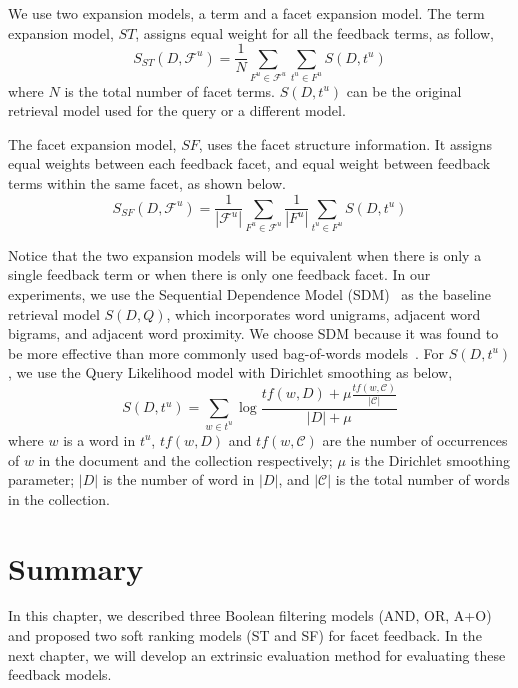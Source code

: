 We use two expansion models, a term and a facet expansion model. The term expansion model, $ST$, assigns equal weight for all the feedback terms, as follow,
\begin{equation}
S_{ST}(D,\mathcal{F}^u) = \frac{1}{N}\sum_{F^u\in\mathcal{F}^u}{\sum_{t^u\in F^u}{S(D,t^u)}}
\end{equation}
where $N$ is the total number of facet terms. $S(D,t^u)$ can be the original retrieval model used for the query or a different model.

The facet expansion model, $SF$, uses the facet structure information. It assigns equal weights between each feedback facet, and equal weight between feedback terms within the same facet, as shown below.
\begin{equation}
S_{SF}(D,\mathcal{F}^u) = \frac{1}{|\mathcal{F}^u|} \sum_{F^u \in \mathcal{F}^u}{ \frac{1}{|F^u|} \sum_{t^u \in F^u}{S(D, t^u)}}
\end{equation}

Notice that the two expansion models will be equivalent when there is only a single feedback term or when there is only one feedback facet. In our experiments, we use the Sequential Dependence Model (SDM)~\cite{metzler2005markov} as the baseline retrieval model $S(D,Q)$, which incorporates word unigrams, adjacent word bigrams, and adjacent word proximity. We choose SDM because it was found to be more effective than more commonly used bag-of-words models~\cite{huston2014comparison}. For $S(D,t^u)$, we use the Query Likelihood model with Dirichlet smoothing as below,
\begin{equation}
S(D,t^u)=\sum_{w\in t^u}{\log\frac{tf(w,D)+\mu\frac{tf(w,\mathcal{C})}{|\mathcal{C}|}}{|D|+\mu}}
\end{equation}
where $w$ is a word in $t^u$, $tf(w,D)$ and $tf(w,\mathcal{C})$ are the number of occurrences of $w$ in the document and the collection respectively; $\mu$ is the Dirichlet smoothing parameter; $|D|$ is the number of word in $|D|$, and $|\mathcal{C}|$ is the total number of words in the collection.

\section{Summary}
In this chapter, we described three Boolean filtering models (AND, OR, A+O) and proposed two soft ranking models (ST and SF) for facet feedback. In the next chapter, we will develop an extrinsic evaluation method for evaluating these feedback models.